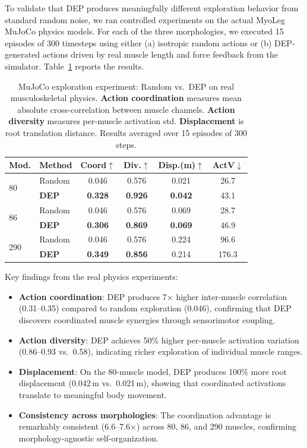 \documentclass[10pt,twocolumn]{article}
\begin{document}
To validate that DEP produces meaningfully different exploration behavior from standard random noise, we ran controlled experiments on the actual MyoLeg MuJoCo physics models. For each of the three morphologies, we executed 15 episodes of 300 timesteps using either (a) isotropic random actions or (b) DEP-generated actions driven by real muscle length and force feedback from the simulator. Table~\ref{tab:mujoco} reports the results.

\begin{table}[t]
\centering
\caption{MuJoCo exploration experiment: Random vs.\ DEP on real musculoskeletal physics. \textbf{Action coordination} measures mean absolute cross-correlation between muscle channels. \textbf{Action diversity} measures per-muscle activation std. \textbf{Displacement} is root translation distance. Results averaged over 15 episodes of 300 steps.}
\label{tab:mujoco}
\footnotesize
\setlength{\tabcolsep}{3pt}
\begin{tabular}{llcccc}
\toprule
\textbf{Mod.} & \textbf{Method} & \textbf{Coord$\uparrow$} & \textbf{Div.$\uparrow$} & \textbf{Disp.(m)$\uparrow$} & \textbf{ActV$\downarrow$} \\
\midrule
\multirow{2}{*}{80}
& Random & 0.046 & 0.576 & 0.021 & 26.7 \\
& \textbf{DEP} & \textbf{0.328} & \textbf{0.926} & \textbf{0.042} & 43.1 \\
\midrule
\multirow{2}{*}{86}
& Random & 0.046 & 0.576 & 0.069 & 28.7 \\
& \textbf{DEP} & \textbf{0.306} & \textbf{0.869} & \textbf{0.069} & 46.9 \\
\midrule
\multirow{2}{*}{290}
& Random & 0.046 & 0.576 & 0.224 & 96.6 \\
& \textbf{DEP} & \textbf{0.349} & \textbf{0.856} & 0.214 & 176.3 \\
\bottomrule
\end{tabular}
\end{table}

Key findings from the real physics experiments:
\begin{itemize}[nosep, leftmargin=*]
\item \textbf{Action coordination}: DEP produces 7$\times$ higher inter-muscle correlation (0.31--0.35) compared to random exploration (0.046), confirming that DEP discovers coordinated muscle synergies through sensorimotor coupling.
\item \textbf{Action diversity}: DEP achieves 50\% higher per-muscle activation variation (0.86--0.93 vs.\ 0.58), indicating richer exploration of individual muscle ranges.
\item \textbf{Displacement}: On the 80-muscle model, DEP produces 100\% more root displacement (0.042\,m vs.\ 0.021\,m), showing that coordinated activations translate to meaningful body movement.
\item \textbf{Consistency across morphologies}: The coordination advantage is remarkably consistent (6.6--7.6$\times$) across 80, 86, and 290 muscles, confirming morphology-agnostic self-organization.
\end{itemize}
\end{document}
